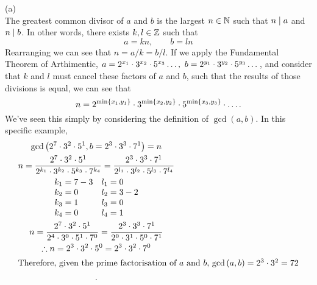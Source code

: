 \documentclass[a4paper, 11pt]{report}
\begin{document}
\newpage
{}
\sol (a) \\
The greatest common divisor of $a$ and $b$ is the largest $n\in\mathbb{N}$ such that $n\mid a$ and $n\mid b$. In other words, there exists $k,l\in\mathbb{Z}$ such that
$$
  a = kn,\qquad b = ln
$$
Rearranging we can see that $n = a/k = b/l$. If we apply the Fundamental Theorem of Arthimentic, $a = 2^{x_1}\cdot3^{x_2}\cdot5^{x_3}\dots,\ b = 2^{y_1}\cdot3^{y_2}\cdot5^{y_3}\dots$, and consider that $k$ and $l$ must cancel these factors of $a$ and $b$, such that the results of those divisions is equal, we can see that 
$$
  n = 2^{\min\left\lbrace x_1,y_1 \right\rbrace}\cdot3^{\min\left\lbrace x_2,y_2 \right\rbrace}\cdot5^{\min\left\lbrace x_3,y_3 \right\rbrace}\cdot\dots.
$$
We've seen this simply by considering the definition of $\gcd(a,b)$. In this specific example,
\begin{gather*}
  \gcd\left( 2^7\cdot3^2\cdot5^1, b = 2^3\cdot3^3\cdot7^1 \right) = n \\
  n = \frac{2^7\cdot3^2\cdot5^1}{2^{k_1}\cdot3^{k_2}\cdot5^{k_3}\cdot7^{k_4}} = \frac{2^3\cdot3^3\cdot7^1}{2^{l_1}\cdot3^{l_2}\cdot5^{l_3}\cdot7^{l_4}} \\
  \begin{array}{ll}
    k_1 = 7 - 3 & l_1 = 0 \\
    k_2 = 0     & l_2 = 3 - 2 \\
    k_3 = 1     & l_3 = 0 \\
    k_4 = 0     & l_4 = 1 \\
  \end{array} \\
  n = \frac{2^7\cdot3^2\cdot5^1}{2^{4}\cdot3^{0}\cdot5^{1}\cdot7^{0}} = \frac{2^3\cdot3^3\cdot7^1}{2^{0}\cdot3^{1}\cdot5^{0}\cdot7^{1}} \\
  \therefore n = 2^3\cdot3^2\cdot5^0 = 2^3\cdot3^2\cdot7^0 \\
  \intertext{Therefore, given the prime factorisation of $a$ and $b$, $\gcd\left( a,b \right)=2^3\cdot3^2=72$}.
\end{gather*}
\end{document}
